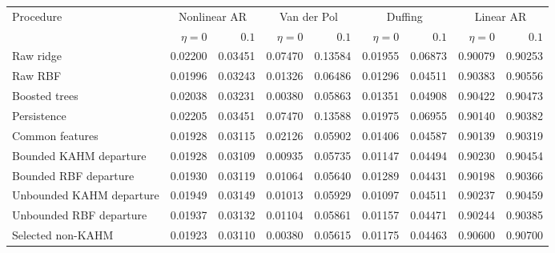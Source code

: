 \begin{tabular}{@{}lrrrrrrrr@{}}
\toprule
Procedure & \multicolumn{2}{c}{Nonlinear AR} & \multicolumn{2}{c}{Van der Pol} & \multicolumn{2}{c}{Duffing} & \multicolumn{2}{c}{Linear AR} \\
 & $\eta=0$ & $0.1$ & $\eta=0$ & $0.1$ & $\eta=0$ & $0.1$ & $\eta=0$ & $0.1$ \\
\midrule
Raw ridge & 0.02200 & 0.03451 & 0.07470 & 0.13584 & 0.01955 & 0.06873 & 0.90079 & 0.90253 \\
Raw RBF & 0.01996 & 0.03243 & 0.01326 & 0.06486 & 0.01296 & 0.04511 & 0.90383 & 0.90556 \\
Boosted trees & 0.02038 & 0.03231 & 0.00380 & 0.05863 & 0.01351 & 0.04908 & 0.90422 & 0.90473 \\
Persistence & 0.02205 & 0.03451 & 0.07470 & 0.13588 & 0.01975 & 0.06955 & 0.90140 & 0.90382 \\
Common features & 0.01928 & 0.03115 & 0.02126 & 0.05902 & 0.01406 & 0.04587 & 0.90139 & 0.90319 \\
Bounded KAHM departure & 0.01928 & 0.03109 & 0.00935 & 0.05735 & 0.01147 & 0.04494 & 0.90230 & 0.90454 \\
Bounded RBF departure & 0.01930 & 0.03119 & 0.01064 & 0.05640 & 0.01289 & 0.04431 & 0.90198 & 0.90366 \\
Unbounded KAHM departure & 0.01949 & 0.03149 & 0.01013 & 0.05929 & 0.01097 & 0.04511 & 0.90237 & 0.90459 \\
Unbounded RBF departure & 0.01937 & 0.03132 & 0.01104 & 0.05861 & 0.01157 & 0.04471 & 0.90244 & 0.90385 \\
Selected non-KAHM & 0.01923 & 0.03110 & 0.00380 & 0.05615 & 0.01175 & 0.04463 & 0.90600 & 0.90700 \\
\bottomrule
\end{tabular}
